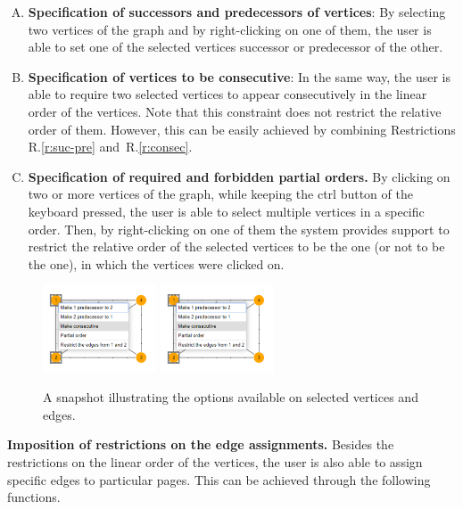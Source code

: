 \documentclass[runningheads]{llncs}
\begin{document}
\begin{enumerate}[R.1]
\item \label{r:suc-pre} \textbf{Specification of successors and predecessors of vertices}: By selecting two vertices of the graph and by right-clicking on one of them, the user is able to set one of the selected vertices successor or predecessor of the other.
\item \label{r:consec} \textbf{Specification of vertices to be consecutive}: In the same way, the user is able to require two selected vertices to appear consecutively in the linear order of the vertices. Note that this constraint does not restrict the relative order of them. However, this can be easily achieved by combining Restrictions R.\ref{r:suc-pre} and~R.\ref{r:consec}. 
\item \label{r:order} \textbf{Specification of required and forbidden partial orders.}  By clicking on two or more vertices of the graph, while keeping the ctrl button of the keyboard pressed, the user is able to select multiple vertices in a specific order. Then, by right-clicking on one of them the system provides support to restrict the relative order of the selected vertices to be the one (or not to be the one), in which the vertices were clicked on. 
\end{enumerate}
%
\begin{figure}[t]
	\centering
	\includegraphics[width=0.3\textwidth,page=1]{options}
	\hfil
	\includegraphics[width=0.3\textwidth,page=2]{options}
   \caption{%
   A snapshot illustrating the options available on selected    
   vertices and edges.}
\label{fig:options}
\end{figure}
%
\noindent\textbf{Imposition of restrictions on the edge assignments.} Besides the restrictions on the linear order of the vertices, the user is also able to assign specific edges to particular pages. This can be achieved through the following functions.
\end{document}
